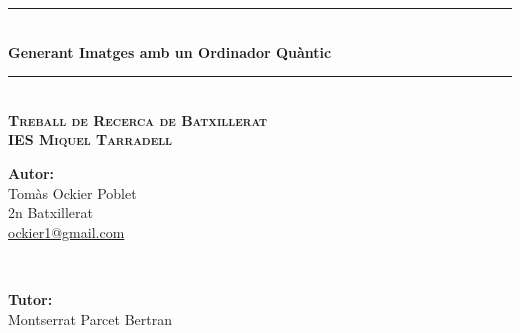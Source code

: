 \documentclass[a4paper,12pt,arial,numbered,print,index,oneside]{book}
\newcommand{\HRule}{\rule{\linewidth}{0.5mm}} %
\begin{document}
	\begin{titlepage}
		
		\begin{center}
		\begin{singlespace}%
		

		
		\HRule \\[0.4cm]
		{ \Huge \bfseries Generant Imatges amb un Ordinador Quàntic}\\[0.1cm] 
		\HRule \\[1.2cm]
		
		\textsc{\Large \textbf{Treball de Recerca de Batxillerat}}\\[.5cm]
		
		\textsc{\large \textbf{IES Miquel Tarradell}}\\[2cm]
		
		
		\vspace{8.5cm}
		\begin{minipage}{0.48\textwidth}
			\begin{flushleft} \large
				\Large \textbf{Autor:}\\
				\Large Tomàs Ockier Poblet \\ 2n Batxillerat \\ \href{mailto:ockier1@gmail.com}{ockier1@gmail.com}
			\end{flushleft}
		\end{minipage}
		~
		\begin{minipage}{0.48\textwidth}
			\begin{flushright} \large
				\Large \textbf{Tutor:} \\
				\Large Montserrat Parcet Bertran 
			\end{flushright}
		\end{minipage}\\
		

\end{singlespace}
\end{center}
\end{titlepage}
\end{document}
